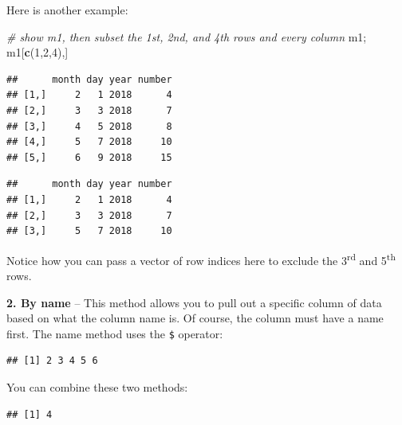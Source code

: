 \documentclass[]{book}
\newenvironment{Shaded}{\begin{snugshade}}{\end{snugshade}}
\newcommand{\KeywordTok}[1]{\textcolor[rgb]{0.13,0.29,0.53}{\textbf{#1}}}
\newcommand{\DecValTok}[1]{\textcolor[rgb]{0.00,0.00,0.81}{#1}}
\newcommand{\CommentTok}[1]{\textcolor[rgb]{0.56,0.35,0.01}{\textit{#1}}}
\newcommand{\OperatorTok}[1]{\textcolor[rgb]{0.81,0.36,0.00}{\textbf{#1}}}
\newcommand{\NormalTok}[1]{#1}
\theoremstyle{definition}
\theoremstyle{definition}
\theoremstyle{definition}
\theoremstyle{remark}
\begin{document}
Here is another example:

\begin{Shaded}
\begin{Highlighting}[]
\CommentTok{# show m1, then subset the 1st, 2nd, and 4th rows and every column}
\NormalTok{m1; m1[}\KeywordTok{c}\NormalTok{(}\DecValTok{1}\NormalTok{,}\DecValTok{2}\NormalTok{,}\DecValTok{4}\NormalTok{),]}
\end{Highlighting}
\end{Shaded}

\begin{verbatim}
##      month day year number
## [1,]     2   1 2018      4
## [2,]     3   3 2018      7
## [3,]     4   5 2018      8
## [4,]     5   7 2018     10
## [5,]     6   9 2018     15
\end{verbatim}

\begin{verbatim}
##      month day year number
## [1,]     2   1 2018      4
## [2,]     3   3 2018      7
## [3,]     5   7 2018     10
\end{verbatim}

Notice how you can pass a vector of row indices here to exclude the
3\textsuperscript{rd} and 5\textsuperscript{th} rows.

\textbf{2. By name} -- This method allows you to pull out a specific
column of data based on what the column name is. Of course, the column
must have a name first. The name method uses the \texttt{\$} operator:

\begin{Shaded}
\end{Shaded}

\begin{verbatim}
## [1] 2 3 4 5 6
\end{verbatim}

You can combine these two methods:

\begin{Shaded}
\end{Shaded}

\begin{verbatim}
## [1] 4
\end{verbatim}
\end{document}
